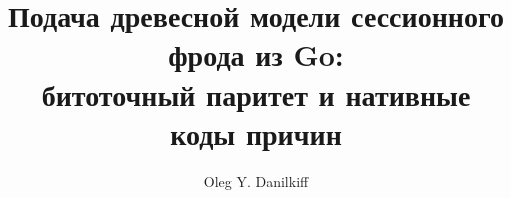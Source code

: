 \documentclass[11pt,a4paper]{article}
\title{Подача древесной модели сессионного фрода из Go:\\
       битоточный паритет и нативные коды причин}
\author{Oleg Y. Danilkiff}
\date{}
\begin{document}
\maketitle

\begin{abstract}

\end{abstract}










\printbibliography
\end{document}

